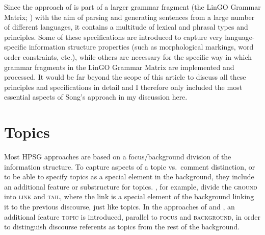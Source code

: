\documentclass[output=paper]{langsci/langscibook}
\begin{document}
Since the approach of \cite{song2018} is part of a larger grammar
fragment (the LinGO Grammar Matrix; \citealt{BDFPS2010a-u}) with the aim
of parsing and generating sentences from a large number of different
languages, it contains a multitude of lexical and phrasal types and
principles. Some of these specifications are introduced to capture
very language-specific information structure properties (such as
morphological markings, word order constraints, etc.), while others are
necessary for the specific way in which grammar fragments in the LinGO
Grammar Matrix are implemented and processed. It would be far beyond
the scope of this article to discuss all these principles and
specifications in detail and I therefore only included the most
essential aspects of Song's approach in my discussion here.

\section{Topics}
\label{sec:topic}

Most HPSG approaches are based on a focus/background division of the
information structure. To capture aspects of a topic vs.\ comment
distinction, or to be able to specify topics as a special element in
the background, they include an additional feature or substructure for
topics. \cite{EV96a}, for example, divide the \textsc{ground} into
\textsc{link} and \textsc{tail}, where the link is a special element
of the background linking it to the previous discourse, just like
topics. In the approaches of \cite{deKuthy2002a} and \cite{Paggio2009a-u}, an additional feature
\textsc{topic} is introduced, parallel to \textsc{focus} and
\textsc{background}, in order to distinguish discourse referents as
topics from the rest of the background.
\end{document}
